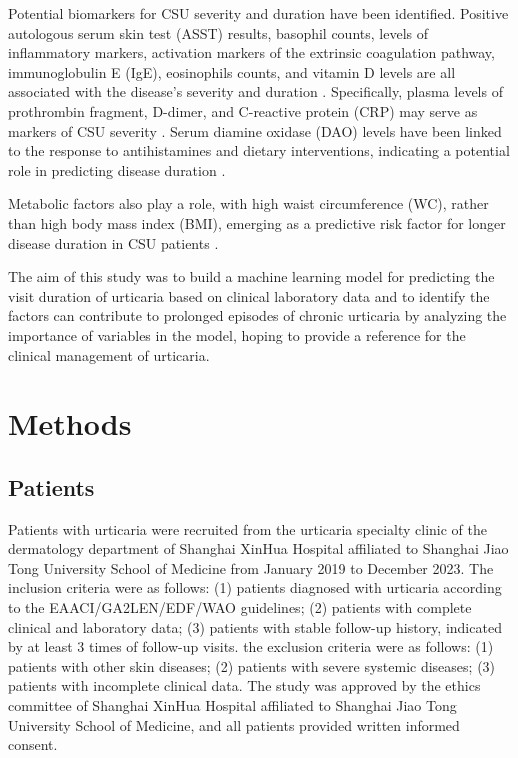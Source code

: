 \documentclass[final,3p,times,authoryear]{elsarticle}
\begin{document}
Potential biomarkers for CSU severity and duration have been identified. Positive autologous serum skin test (ASST) results, basophil counts, levels of inflammatory markers, activation markers of the extrinsic coagulation pathway, immunoglobulin E (IgE), eosinophils counts, and vitamin D levels are all associated with the disease's severity and duration \citep{SanchezBorges2017Factors,Rabelo-Filardi2013Parameters, Kolkhir2019Eosinopenia}. Specifically, plasma levels of prothrombin fragment, D-dimer, and C-reactive protein (CRP) may serve as markers of CSU severity \citep{Rabelo-Filardi2013Parameters}. Serum diamine oxidase (DAO) levels have been linked to the response to antihistamines and dietary interventions, indicating a potential role in predicting disease duration \citep{Chiang2022Predictors}.

Metabolic factors also play a role, with high waist circumference (WC), rather than high body mass index (BMI), emerging as a predictive risk factor for longer disease duration in CSU patients \citep{Kim2021High}.

The aim of this study was to build a machine learning model for predicting the visit duration of urticaria based on clinical laboratory data and to identify the factors can contribute to prolonged episodes of chronic urticaria by analyzing the importance of variables in the model, hoping to provide a reference for the clinical management of urticaria.

\section{Methods}\label{Methods}

\subsection{Patients}\label{Patients}

Patients with urticaria were recruited from the urticaria specialty clinic of the dermatology department of Shanghai XinHua Hospital affiliated to Shanghai Jiao Tong University School of Medicine from January 2019 to December 2023. The inclusion criteria were as follows: (1) patients diagnosed with urticaria according to the EAACI/GA2LEN/EDF/WAO guidelines\citep{Zuberbier2021The}; (2) patients with complete clinical and laboratory data; (3) patients with stable follow-up history, indicated by at least 3 times of follow-up visits. the exclusion criteria were as follows: (1) patients with other skin diseases; (2) patients with severe systemic diseases; (3) patients with incomplete clinical data. The study was approved by the ethics committee of Shanghai XinHua Hospital affiliated to Shanghai Jiao Tong University School of Medicine, and all patients provided written informed consent.
\end{document}
